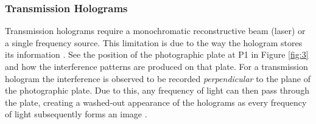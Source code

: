 \documentclass[12pt]{article}
\begin{document}
\subsubsection{Transmission Holograms}

Transmission holograms require a monochromatic reconstructive beam (laser) or a single frequency source. This limitation is due to the way the hologram stores its information \cite{princetonholo}.
See the position of the photographic plate at P1 in Figure \ref{fig:3} and how the interference patterns are produced on that plate.
For a transmission hologram the interference is observed to be recorded \textit{perpendicular} to the plane of the photographic plate. Due to this, any frequency of light can then
pass through the plate, creating a washed-out appearance of the holograms as every frequency of light subsequently forms an image \cite{princetonholo}.
\end{document}
